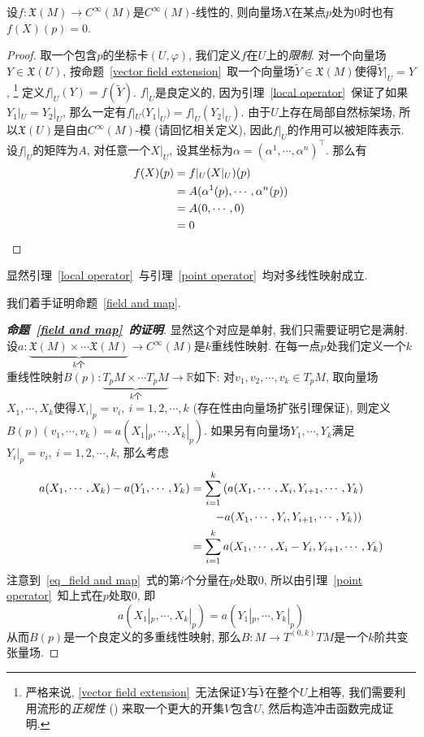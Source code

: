 \begin{lem}\label{point operator}
    设$f:\mathfrak{X}(M)\to C^\infty(M)$是$C^\infty(M)$-线性的, 则向量场$X$在某点$p$处为$0$时也有$f(X)(p)=0$.
\end{lem}
\begin{proof}
    取一个包含$p$的坐标卡$(U,\varphi)$, 我们定义$f$在$U$上的\textit{限制}.
    对一个向量场$Y\in\mathfrak{X}(U)$, 按命题~\ref{vector field extension}~取一个向量场$\widetilde{Y}\in\mathfrak{X}(M)$使得$\widetilde{Y}|_U=Y$,
    \footnote{严格来说, \ref{vector field extension}~无法保证$Y$与$\widetilde{Y}$在整个$U$上相等, 我们需要利用流形的\textit{正规性} (\Parencite[定理4.81]{Lee_IntroTopoMani}) 来取一个更大的开集$V$包含$U$, 然后构造冲击函数完成证明.}
    定义$f|_U(Y)=f(\widetilde{Y})$.
    $f|_U$是良定义的, 因为引理~\ref{local operator}~保证了如果$Y_1|_U=Y_2|_U$, 那么一定有$f|_U(Y_1|_U)=f|_U(Y_2|_U)$.
    由于$U$上存在局部自然标架场, 所以$\mathfrak{X}(U)$是自由$C^\infty(M)$-模 (请回忆相关定义),
    因此$f|_U$的作用可以被矩阵表示.
    设$f|_U$的矩阵为$A$, 对任意一个$X|_U$, 设其坐标为$\alpha=(\alpha^1,\cdots,\alpha^n)^\top$.
    那么有
    \begin{align*}
        f(X)(p)&=f|_U(X|_U)(p)\\
        &=A(\alpha^1(p),\cdots,\alpha^n(p))\\
        &=A(0,\cdots,0)\\
        &=0\qedhere
    \end{align*}
\end{proof}

\begin{col}
    显然引理~\ref{local operator}~与引理~\ref{point operator}~均对多线性映射成立.
\end{col}

我们着手证明命题~\ref{field and map}.
\begin{proof}[{\bf 命题~\ref{field and map}~的证明}]
    显然这个对应是单射, 我们只需要证明它是满射.
    设$a:\underbrace{\mathfrak{X}(M)\times\cdots\mathfrak{X}(M)}_{k\text{个}}\to C^\infty(M)$是$k$重线性映射.
    在每一点$p$处我们定义一个$k$重线性映射$B(p):\underbrace{T_pM\times\cdots T_pM}_{k\text{个}}\to\mathbb{R}$如下:
    对$v_1,v_2,\cdots,v_k\in T_pM$, 取向量场$X_1,\cdots,X_k$使得$X_i|_p=v_i,\ i=1,2,\cdots,k$ (存在性由向量场扩张引理保证),
    则定义$B(p)(v_1,\cdots,v_k)=a(X_1|_p,\cdots,X_k|_p)$.
    如果另有向量场$Y_1,\cdots,Y_k$满足$Y_i|_p=v_i,\ i=1,2,\cdots,k$, 那么考虑
    \begin{align}
        a(X_1,\cdots,X_k)-a(Y_1,\cdots,Y_k)&=\sum_{i=1}^k\left(a(X_1,\cdots,X_i,Y_{i+1},\cdots,Y_k)\right.\notag\\
        &\qquad\left.-a(X_1,\cdots,Y_i,Y_{i+1},\cdots,Y_k)\right)\notag\\
        &=\sum_{i=1}^ka(X_1,\cdots,X_i-Y_i,Y_{i+1},\cdots,Y_k)\label{eq_field and map}
    \end{align}
    注意到~\eqref{eq_field and map}~式的第$i$个分量在$p$处取$0$, 所以由引理~\ref{point operator}~知上式在$p$处取$0$, 即
    \[a(X_1|_p,\cdots,X_k|_p)=a(Y_1|_p,\cdots,Y_k|_p)\]
    从而$B(p)$是一个良定义的多重线性映射, 那么$B:M\to T^{(0,k)}TM$是一个$k$阶共变张量场.
\end{proof}

